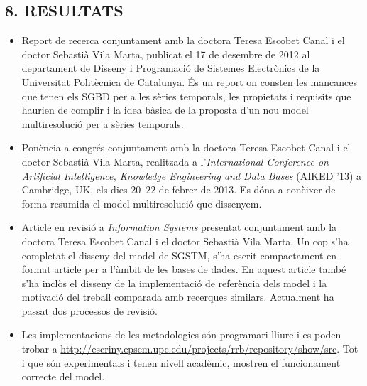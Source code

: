 \documentclass{scrartcl}
\begin{document}
\begin{itemize}




\end{itemize}





\subsection*{8. RESULTATS}

\begin{itemize}


\item Report de recerca conjuntament amb la
  doctora Teresa Escobet Canal i el doctor Sebastià Vila Marta,
  publicat el 17 de desembre de 2012 al departament de Disseny i
  Programació de Sistemes Electrònics de la Universitat Politècnica de
  Catalunya. És un report on consten les mancances que tenen els
  SGBD per a les sèries temporals, les propietats i requisits
  que haurien de complir i la idea bàsica de la proposta d'un nou
  model multiresolució per a sèries temporals.

\item Ponència a congrés  conjuntament amb la
  doctora Teresa Escobet Canal i el doctor Sebastià Vila Marta, realitzada
  a l'\emph{International Conference on Artificial Intelligence, Knowledge
  Engineering and Data Bases} (AIKED '13) a Cambridge, UK, els dies
  20--22 de febrer de 2013.  Es dóna a conèixer de forma resumida el
  model multiresolució que dissenyem.


\item Article en revisió a \emph{Information Systems} presentat
  conjuntament amb la doctora Teresa Escobet Canal i el doctor
  Sebastià Vila Marta. Un cop s'ha completat el disseny del model de
  SGSTM, s'ha escrit compactament en format article per a
  l'àmbit de les bases de dades.  En aquest article també s'ha inclòs
  el disseny de la implementació de referència dels model i la
  motivació del treball comparada amb recerques similars.
  Actualment ha passat dos processos de revisió.

\item Les implementacions de les metodologies són  programari lliure
  i es poden trobar a
  \url{http://escriny.epsem.upc.edu/projects/rrb/repository/show/src}. Tot
  i que són experimentals i tenen nivell acadèmic, mostren el
  funcionament correcte del model.

\end{itemize}
\end{document}
